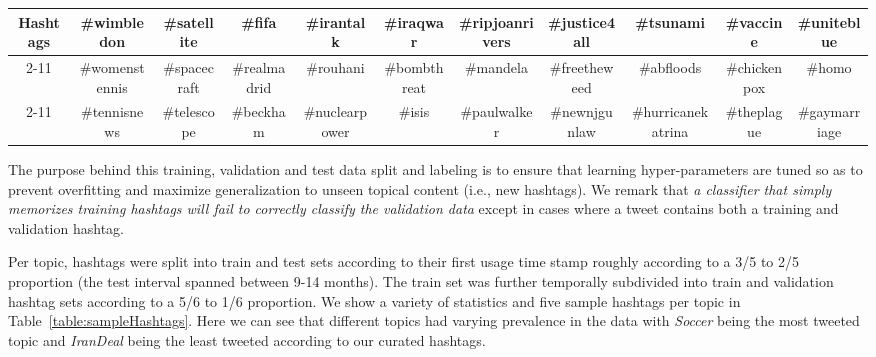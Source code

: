 \begin{table*}[t!]
{{\begin{tabular}{|c|c|c|c|c|c|c|c|c|c|c|}
\textbf{Hashtags} & \#wimbledon & \#satellite & \#fifa & \#irantalk & \#iraqwar & \#ripjoanrivers & \#justice4all & \#tsunami & \#vaccine & \#uniteblue\tabularnewline
\cline{2-11} \cline{3-11} \cline{4-11} \cline{5-11} \cline{6-11} \cline{7-11} \cline{8-11} \cline{9-11} \cline{10-11} \cline{11-11} 
 & \#womenstennis & \#spacecraft & \#realmadrid & \#rouhani & \#bombthreat & \#mandela & \#freetheweed & \#abfloods & \#chickenpox & \#homo\tabularnewline
\cline{2-11} \cline{3-11} \cline{4-11} \cline{5-11} \cline{6-11} \cline{7-11} \cline{8-11} \cline{9-11} \cline{10-11} \cline{11-11} 
 & \#tennisnews & \#telescope & \#beckham & \#nuclearpower & \#isis & \#paulwalker & \#newnjgunlaw & \#hurricanekatrina & \#theplague & \#gaymarriage\tabularnewline
\hline 
\end{tabular}

}
}
\label{table:sampleHashtags}
\end{table*}


The purpose behind this training, validation and test data split
and labeling is to ensure that learning hyper-parameters are tuned so as
to prevent overfitting and maximize generalization to unseen topical
content (i.e., new hashtags).
We remark that \emph{a classifier that simply
memorizes training hashtags will fail to correctly classify the validation data} except in 
cases where a tweet contains both a training and validation hashtag. 

Per topic, hashtags were split into train and test sets
according to their first usage time stamp roughly according to a 3/5
to 2/5 proportion (the test interval spanned between 9-14 months).  
The train set was further temporally subdivided
into train and validation hashtag sets according to a 5/6 to 1/6
proportion.  We show a variety of statistics and five sample hashtags
per topic in Table~\ref{table:sampleHashtags}.  Here we can see that
different topics had varying prevalence in the data
with \textit{Soccer} being the most tweeted topic
and \textit{IranDeal} being the least tweeted according to our curated
hashtags.


